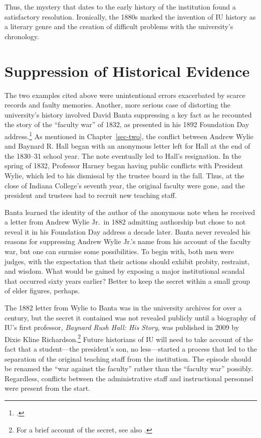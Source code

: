 \documentclass[
  american,
  letterpaper,
]{scrreprt}
\begin{document}
Thus, the mystery that dates to the early history of the institution
found a satisfactory resolution. Ironically, the 1880s marked the
invention of IU history as a literary genre and the creation of
difficult problems with the university's chronology.

\section{Suppression of Historical
Evidence}\label{suppression-of-historical-evidence}

The two examples cited above were unintentional errors exacerbated by
scarce records and faulty memories. Another, more serious case of
distorting the university's history involved David Banta suppressing a
key fact as he recounted the story of the ``faculty war'' of 1832, as
presented in his 1892 Foundation Day address.\footnote{.} As mentioned in Chapter~\ref{sec-two}, the conflict
between Andrew Wylie and Baynard R. Hall began with an anonymous letter
left for Hall at the end of the 1830--31 school year. The note
eventually led to Hall's resignation. In the spring of 1832, Professor
Harney began having public conflicts with President Wylie, which led to
his dismissal by the trustee board in the fall. Thus, at the close of
Indiana College's seventh year, the original faculty were gone, and the
president and trustees had to recruit new teaching staff.

Banta learned the identity of the author of the anonymous note when he
received a letter from Andrew Wylie Jr.~in 1882 admitting authorship but
chose to not reveal it in his Foundation Day address a decade later.
Banta never revealed his reasons for suppressing Andrew Wylie Jr.'s name
from his account of the faculty war, but one can surmise some
possibilities. To begin with, both men were judges, with the expectation
that their actions should exhibit probity, restraint, and wisdom. What
would be gained by exposing a major institutional scandal that occurred
sixty years earlier? Better to keep the secret within a small group of
elder figures, perhaps.

The 1882 letter from Wylie to Banta was in the university archives for
over a century, but the secret it contained was not revealed publicly
until a biography of IU's first professor, \emph{Baynard Rush Hall: His
Story}, was published in 2009 by Dixie Kline Richardson.\footnote{For a
  brief account of the secret, see also
  .} Future historians of IU will need
to take account of the fact that a student---the president's son, no
less---started a process that led to the separation of the original
teaching staff from the institution. The episode should be renamed the
``war against the faculty'' rather than the ``faculty war'' possibly.
Regardless, conflicts between the administrative staff and instructional
personnel were present from the start.
\end{document}
